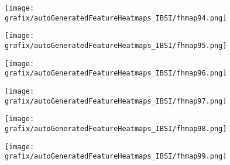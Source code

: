 \hspace{\hsp} 
\begin{subfigure}{\wid\textwidth} 
    \centering 
    \caption{\tiny \sffamily {}} 
    \vspace{\vsp} 
    \texttt{[image: grafix/autoGeneratedFeatureHeatmaps\_IBSI/fhmap94.png]} 
\end{subfigure} 
\hspace{\hsp} 
\begin{subfigure}{\wid\textwidth} 
    \centering 
    \caption{\tiny \sffamily {}} 
    \vspace{\vsp} 
    \texttt{[image: grafix/autoGeneratedFeatureHeatmaps\_IBSI/fhmap95.png]} 
\end{subfigure} 
\hspace{\hsp} 
\begin{subfigure}{\wid\textwidth} 
    \centering 
    \caption{\tiny \sffamily {}} 
    \vspace{\vsp} 
    \texttt{[image: grafix/autoGeneratedFeatureHeatmaps\_IBSI/fhmap96.png]} 
\end{subfigure} 
\hspace{\hsp} 
\begin{subfigure}{\wid\textwidth} 
    \centering 
    \caption{\tiny \sffamily {}} 
    \vspace{\vsp} 
    \texttt{[image: grafix/autoGeneratedFeatureHeatmaps\_IBSI/fhmap97.png]} 
\end{subfigure} 
\hspace{\hsp} 
\begin{subfigure}{\wid\textwidth} 
    \centering 
    \caption{\tiny \sffamily {}} 
    \vspace{\vsp} 
    \texttt{[image: grafix/autoGeneratedFeatureHeatmaps\_IBSI/fhmap98.png]} 
\end{subfigure} 
\hspace{\hsp} 
\begin{subfigure}{\wid\textwidth} 
    \centering 
    \caption{\tiny \sffamily {}} 
    \vspace{\vsp} 
    \texttt{[image: grafix/autoGeneratedFeatureHeatmaps\_IBSI/fhmap99.png]} 
\end{subfigure} 
\hspace{\hsp} 
